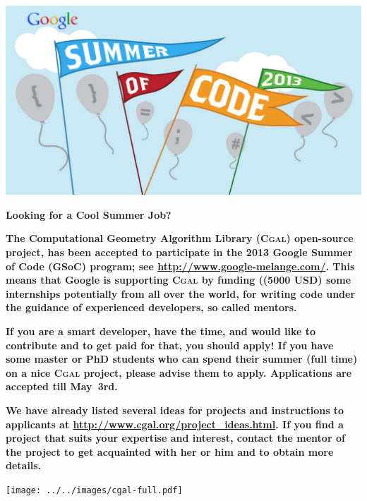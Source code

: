 \documentclass[12pt,a4paper]{article}
\newcommand{\cgal}{\textsc{Cgal}}
\begin{document}
\begin{framed}
  \newlength{\cgalwidth}\setlength{\cgalwidth}{\linewidth}
  \begin{center}
    \includegraphics[width=\cgalwidth]{soc-logo-google-color.pdf}

    \textbf{\Huge Looking for a Cool Summer Job?}
  \end{center}

  \textbf{\large The Computational Geometry Algorithm Library (\cgal{})
    open-source project, has been accepted to participate in the 2013 Google
    Summer of Code (GSoC) program; see \url{http://www.google-melange.com/}.
    This means that Google is supporting \cgal{} by funding ((5000 USD)
    some internships potentially from all over the world, for writing code
    under the guidance of experienced developers, so called mentors.}

  \textbf{{\large If you are a smart developer, have the time, and
    would like to contribute and to get paid for that, you should
    apply! If you have some master or PhD students who can spend their
    summer (full time) on a nice \cgal{} project, please advise them
    to apply.} Applications are accepted till May~3rd.}

  \textbf{\large We have already listed several ideas for projects and
    instructions to applicants at
    \url{http://www.cgal.org/project_ideas.html}. If you find a project
    that suits your expertise and interest, contact the mentor of the
    project to get acquainted with her or him and to obtain more details.}

  \texttt{[image: ../../images/cgal-full.pdf]}
\end{framed}
\end{document}
